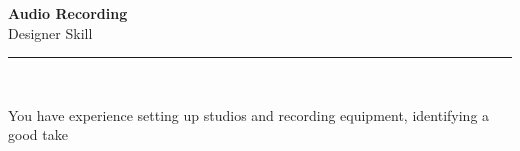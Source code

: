 \documentclass[11pt,a4paper]{memoir}
\begin{document}
    \begin{Spacing}{0.75}%
        \noindent
        \Large
        \textbf{Audio Recording}\\[3pt]
        \scriptsize\color{gray}Designer Skill\\ 
        \rule{\textwidth}{.3mm}\\
        
        \vspace{3mm}
        \noindent
        \begin{minipage}[t]{53mm}
            \begin{flushleft}
            {
                \normalsize
                \begin{Spacing}{1}%
                \color{black}\textrm{You have experience setting up studios and recording equipment, identifying a good take}\\
                \end{Spacing}
            }
            \end{flushleft}
        \end{minipage}

        \vspace{5mm}
        \noindent
        \begin{minipage}[t]{53mm}
            \begin{flushleft}
            {
                \normalsize
                \begin{Spacing}{1}%
                \color{gray}\textit{}\\
                \end{Spacing}
            }
            \end{flushleft}
        \end{minipage}
    \end{Spacing}
    \clearpage
\end{document}
